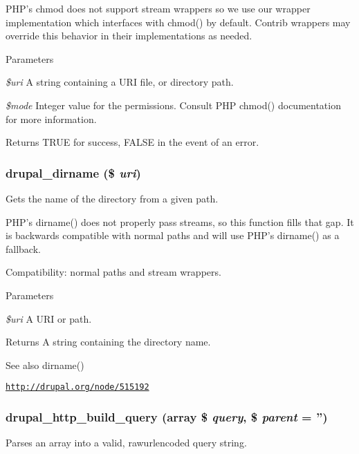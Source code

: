 PHP's chmod does not support stream wrappers so we use our wrapper implementation which interfaces with chmod() by default. Contrib wrappers may override this behavior in their implementations as needed.


\begin{DoxyParams}{Parameters}
\item[{\em \$uri}]A string containing a URI file, or directory path. \item[{\em \$mode}]Integer value for the permissions. Consult PHP chmod() documentation for more information.\end{DoxyParams}
\begin{DoxyReturn}{Returns}
TRUE for success, FALSE in the event of an error. 
\end{DoxyReturn}
\hypertarget{group__php__wrappers_gad00418a5880c03f43e5eccfaa62863f6}{
\subsubsection[{drupal\_\-dirname}]{\setlength{\rightskip}{0pt plus 5cm}drupal\_\-dirname (\$ {\em uri})}}
\label{group__php__wrappers_gad00418a5880c03f43e5eccfaa62863f6}
Gets the name of the directory from a given path.

PHP's dirname() does not properly pass streams, so this function fills that gap. It is backwards compatible with normal paths and will use PHP's dirname() as a fallback.

Compatibility: normal paths and stream wrappers.


\begin{DoxyParams}{Parameters}
\item[{\em \$uri}]A URI or path.\end{DoxyParams}
\begin{DoxyReturn}{Returns}
A string containing the directory name.
\end{DoxyReturn}
\begin{DoxySeeAlso}{See also}
dirname() 

\href{http://drupal.org/node/515192}{\tt http://drupal.org/node/515192} 
\end{DoxySeeAlso}
\hypertarget{group__php__wrappers_gada763092b76d70856870eb3afa2ad265}{
\subsubsection[{drupal\_\-http\_\-build\_\-query}]{\setlength{\rightskip}{0pt plus 5cm}drupal\_\-http\_\-build\_\-query (array \$ {\em query}, \/  \$ {\em parent} = {\ttfamily ''})}}
\label{group__php__wrappers_gada763092b76d70856870eb3afa2ad265}
Parses an array into a valid, rawurlencoded query string.

